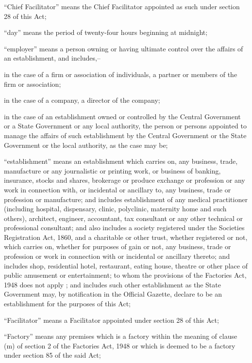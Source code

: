 \documentclass[gaz8]{mhact}
\begin{document}
\begin{subsectionlist}
\item ``Chief Facilitator'' means the Chief Facilitator appointed as such
under section 28 of this Act;
\item ``day'' means the period of twenty-four hours beginning at
midnight;
\item ``employer'' means a person owning or having ultimate control
over the affairs of an establishment, and includes,--
\begin{clause}
\item in the case of a firm or association of individuals, a partner
or members of the firm or association;
\item in the case of a company, a director of the company;
\item in the case of an establishment owned or controlled by the
Central Government or a State Government or any local authority,
the person or persons appointed to manage the affairs of such
establishment by the Central Government or the State Government
or the local authority, as the case may be;
\end{clause}
\item ``establishment'' means an establishment which carries on, any
business, trade, manufacture or any journalistic or printing work, or
business of banking, insurance, stocks and shares, brokerage or produce
exchange or profession or any work in connection with, or incidental or
ancillary to, any business, trade or profession or manufacture; and
includes establishment of any medical practitioner (including hospital,
dispensary, clinic, polyclinic, maternity home and such others), architect,
engineer, accountant, tax consultant or any other technical or
professional consultant; and also includes a society registered under
the Societies Registration Act, 1860, and a charitable or other trust,
whether registered or not, which carries on, whether for purposes of
gain or not, any business, trade or profession or work in connection with
or incidental or ancillary thereto; and includes shop, residential hotel,
restaurant, eating house, theatre or other place of public amusement or
entertainment; to whom the provisions of the Factories Act, 1948 does
not apply ; and includes such other establishment as the State
Government may, by notification in the Official Gazette, declare to be an
establishment for the purposes of this Act;
\item ``Facilitator'' means a Facilitator appointed under section 28 of
this Act;
\item ``Factory'' means any premises which is a factory within the
meaning of clause (m) of section 2 of the Factories Act, 1948 or which is
deemed to be a factory under section 85 of the said Act;


\end{subsectionlist}
\end{document}
